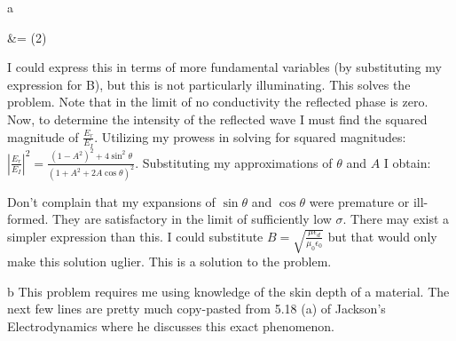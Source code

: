 \begin{homeworkProblem}
\begin{homeworkSection}{a}
\begin{problemAnswer}{\Phi &= \arctan(2)}\end{problemAnswer}

I could express this in terms of more fundamental variables (by substituting my expression for B), but this is not particularly illuminating. This solves the problem. Note that in the limit of no conductivity the reflected phase is zero.
\\

Now, to determine the intensity of the reflected wave I must find the squared magnitude of $\frac{E_r}{E_I}$. Utilizing my prowess in solving for squared magnitudes: $|\frac{E_r}{E_I}|^2 = \frac{(1-A^2)^2+4\sin^2\theta}{(1+A^2+2A\cos\theta)^2}$. Substituting my approximations of $\theta$ and $A$ I obtain:
\begin{problemAnswer}{ }\end{problemAnswer}

Don't complain that my expansions of $\sin\theta$ and $\cos\theta$ were premature or ill-formed. They are satisfactory in the limit of sufficiently low $\sigma$. There may exist a simpler expression than this. I could substitute $B = \sqrt{\frac{\mu\epsilon_d}{\mu_0 \epsilon_0}}$ but that would only make this solution uglier. This is a solution to the problem. 

\end{homeworkSection}

\begin{homeworkSection}{b}
This problem requires me using knowledge of the skin depth of a material. The next few lines are pretty much copy-pasted from 5.18 (a) of Jackson's Electrodynamics where he discusses this exact phenomenon.
\\


\end{homeworkSection}
\end{homeworkProblem}
